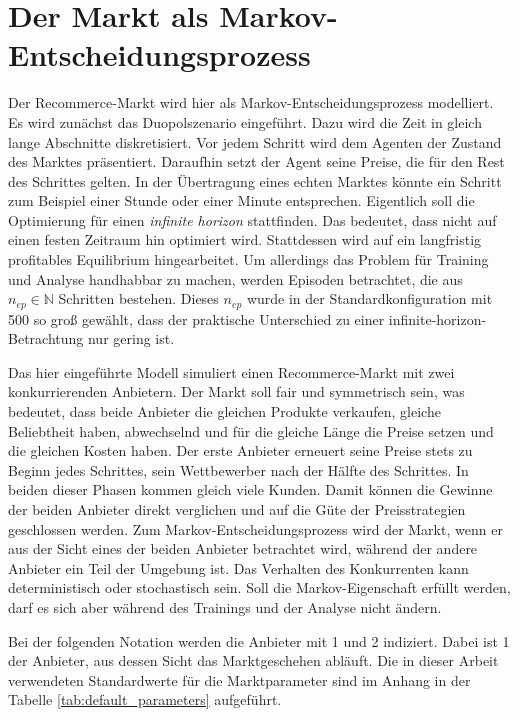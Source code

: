 \section{Der Markt als Markov-Entscheidungsprozess}
\label{section:markov}
Der Recommerce-Markt wird hier als Markov-Entscheidungsprozess modelliert.
Es wird zunächst das Duopolszenario eingeführt.
Dazu wird die Zeit in gleich lange Abschnitte diskretisiert.
Vor jedem Schritt wird dem Agenten der Zustand des Marktes präsentiert.
Daraufhin setzt der Agent seine Preise, die für den Rest des Schrittes gelten.
In der Übertragung eines echten Marktes könnte ein Schritt zum Beispiel einer Stunde oder einer Minute entsprechen.
Eigentlich soll die Optimierung für einen \textit{infinite horizon} stattfinden.
Das bedeutet, dass nicht auf einen festen Zeitraum hin optimiert wird.
Stattdessen wird auf ein langfristig profitables Equilibrium hingearbeitet.
Um allerdings das Problem für Training und Analyse handhabbar zu machen, werden Episoden betrachtet, die aus $n_{ep} \in \mathbb{N}$ Schritten bestehen.
Dieses $n_{ep}$ wurde in der Standardkonfiguration mit 500 so groß gewählt, dass der praktische Unterschied zu einer infinite-horizon-Betrachtung nur gering ist.

Das hier eingeführte Modell simuliert einen Recommerce-Markt mit zwei konkurrierenden Anbietern.
Der Markt soll fair und symmetrisch sein, was bedeutet, dass beide Anbieter die gleichen Produkte verkaufen, gleiche Beliebtheit haben, abwechselnd und für die gleiche Länge die Preise setzen und die gleichen Kosten haben.
Der erste Anbieter erneuert seine Preise stets zu Beginn jedes Schrittes, sein Wettbewerber nach der Hälfte des Schrittes.
In beiden dieser Phasen kommen gleich viele Kunden.
Damit können die Gewinne der beiden Anbieter direkt verglichen und auf die Güte der Preisstrategien geschlossen werden.
Zum Markov-Entscheidungsprozess wird der Markt, wenn er aus der Sicht eines der beiden Anbieter betrachtet wird, während der andere Anbieter ein Teil der Umgebung ist.
Das Verhalten des Konkurrenten kann deterministisch oder stochastisch sein.
Soll die Markov-Eigenschaft erfüllt werden, darf es sich aber während des Trainings und der Analyse nicht ändern.

Bei der folgenden Notation werden die Anbieter mit 1 und 2 indiziert.
Dabei ist 1 der Anbieter, aus dessen Sicht das Marktgeschehen abläuft.
Die in dieser Arbeit verwendeten Standardwerte für die Marktparameter sind im Anhang in der Tabelle \ref{tab:default_parameters} aufgeführt.

